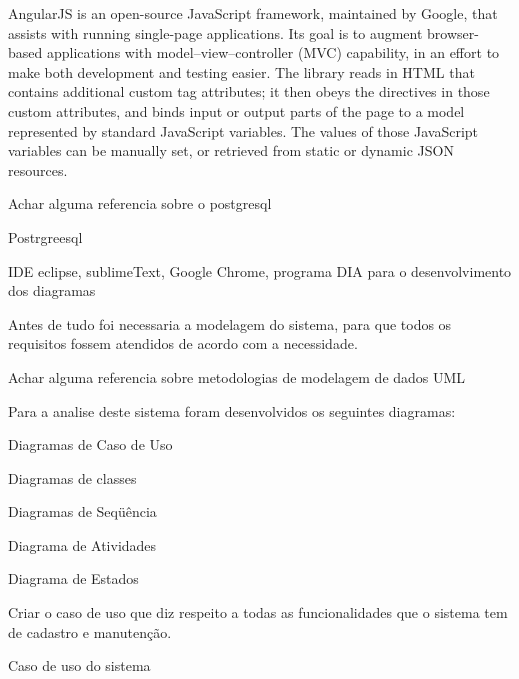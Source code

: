 	AngularJS is an open-source JavaScript framework, maintained by Google, that assists with running single-page applications. Its goal is to augment browser-based applications with model–view–controller (MVC) capability, in an effort to make both development and testing easier.
	The library reads in HTML that contains additional custom tag attributes; it then obeys the directives in those custom attributes, and binds input or output parts of the page to a model represented by standard JavaScript variables. The values of those JavaScript variables can be manually set, or retrieved from static or dynamic JSON resources.\par\cite{alterar}


	Achar alguma referencia sobre o postgresql\par\cite{alterar}
	Postrgreesql


	IDE eclipse, sublimeText, Google Chrome, programa DIA para o desenvolvimento dos diagramas\cite{alterar}


	Antes de tudo foi necessaria a modelagem do sistema, para que todos os requisitos fossem atendidos de acordo com a necessidade.\par

	Achar alguma referencia sobre metodologias de modelagem de dados UML\par\cite{alterar}

	Para a analise deste sistema foram desenvolvidos os seguintes diagramas:\par\cite{alterar}
	
	Diagramas de Caso de Uso\par
	Diagramas de classes\par
	Diagramas de Seqüência\par
	Diagrama de Atividades\par
	Diagrama de Estados\par



	Criar o caso de uso que diz respeito a todas as funcionalidades que o sistema tem de cadastro e manutenção.\par\cite{alterar}

	Caso de uso do sistema\par\cite{alterar}

